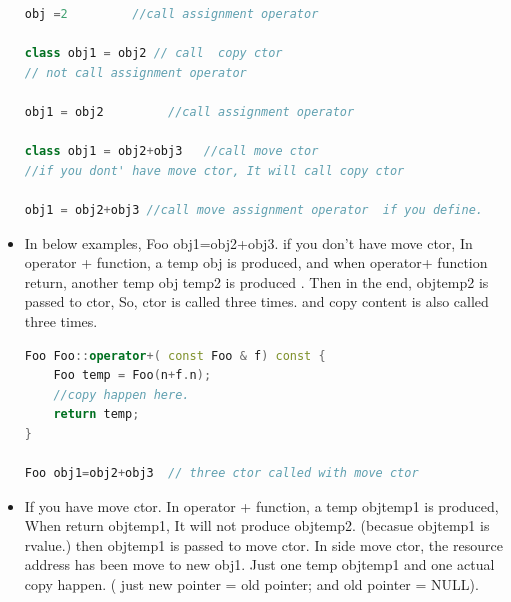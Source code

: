 \documentclass[a4paper,11pt,twoside]{book}
\begin{document}
\begin{itemize}
\begin{lstlisting}[frame=single, language=c++]
obj =2         //call assignment operator
	
class obj1 = obj2 // call  copy ctor
// not call assignment operator
	
obj1 = obj2         //call assignment operator
	
class obj1 = obj2+obj3   //call move ctor
//if you dont' have move ctor, It will call copy ctor
	
obj1 = obj2+obj3 //call move assignment operator  if you define.
\end{lstlisting}
	
	\item In below examples, Foo obj1=obj2+obj3. if you don't have move ctor, In operator + function, a temp obj is produced,  and when operator+ function return, another temp obj temp2 is produced .  Then in the end, objtemp2 is passed to ctor,  So, ctor is called three times. and copy content is also called three times.
	
\begin{lstlisting}[frame=single, language=c++]
Foo Foo::operator+( const Foo & f) const {
	Foo temp = Foo(n+f.n);
	//copy happen here.
	return temp;
}
	
Foo obj1=obj2+obj3  // three ctor called with move ctor
\end{lstlisting}
	
	\item If you have move ctor. In operator + function, a temp objtemp1 is produced,  When return objtemp1, It will not produce objtemp2. (becasue objtemp1 is rvalue.) then objtemp1 is passed to move ctor. In side move ctor, the resource address has been move to new obj1.  Just one temp objtemp1 and one actual copy happen. ( just new pointer = old pointer; and old pointer = NULL).
\end{itemize}
\end{document}
